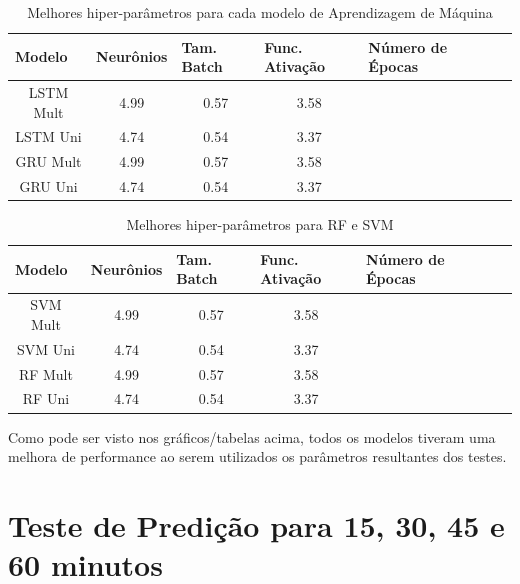 \begin{table}[htbp]
    \caption{Melhores hiper-parâmetros para cada modelo de Aprendizagem de Máquina}
    \label{table:hiper-param-lstm}
    \begin{center}
    \begin{tabular}{ccccccc}
    \hline
    \multicolumn{1}{l}{\textbf{Modelo}} & \multicolumn{1}{l}{\textbf{Neurônios}} & \multicolumn{1}{l}{\textbf{Tam. Batch}} & \multicolumn{1}{l}{\textbf{Func. Ativação}} & \multicolumn{1}{l}{\textbf{Número de Épocas}}\\
    \hline
    LSTM Mult & 4.99 &  0.57 & 3.58  \\ 
    LSTM Uni & 4.74 &  0.54 & 3.37  \\
    GRU Mult & 4.99 &  0.57 & 3.58  \\ 
    GRU Uni & 4.74 &  0.54 & 3.37  \\
    \hline
    \end{tabular}
    \end{center}
\end{table}


\begin{table}[htbp]
    \caption{Melhores hiper-parâmetros para RF e SVM}
    \label{table:hiper-param}
    \begin{center}
    \begin{tabular}{ccccccc}
    \hline
    \multicolumn{1}{l}{\textbf{Modelo}} & \multicolumn{1}{l}{\textbf{Neurônios}} & \multicolumn{1}{l}{\textbf{Tam. Batch}} & \multicolumn{1}{l}{\textbf{Func. Ativação}} & \multicolumn{1}{l}{\textbf{Número de Épocas}}\\
    \hline
    SVM Mult & 4.99 &  0.57 & 3.58  \\ 
    SVM Uni & 4.74 &  0.54 & 3.37  \\
    RF Mult & 4.99 &  0.57 & 3.58  \\ 
    RF Uni & 4.74 &  0.54 & 3.37  \\
    \hline
    \end{tabular}
    \end{center}
\end{table}



Como pode ser visto nos gráficos/tabelas acima, todos os modelos tiveram uma melhora de performance ao serem utilizados os parâmetros resultantes dos testes.

\section{Teste de Predição para 15, 30, 45 e 60 minutos}

